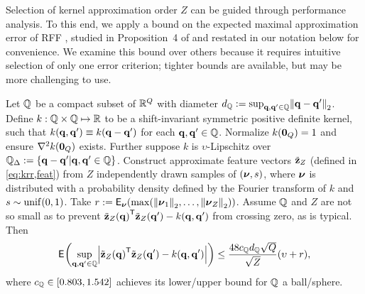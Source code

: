 Selection of kernel approximation order $Z$ 
can be guided through performance analysis.  
To this end, 
we apply a bound 
on the expected maximal approximation error 
of RFF \cite{rahimi:07:rff},
studied in Proposition~4 of \cite{sutherland:15:ote}
and restated in our notation below for convenience.
We examine this bound over others
because it requires intuitive selection 
of only one error criterion;
tighter bounds are available,
but may be more challenging to use.
\begin{thm}
	Let $\mathbb{Q}$ 
	be a compact subset of $\mathbb{R}^{Q}$
	with diameter $d_\setQ := \sup_{\bmq,\bmq' \in \setQ} \norm{\bmq-\bmq'}_2$.
	Define $k : \mathbb{Q} \times \mathbb{Q} \mapsto \mathbb{R}$  
	to be a shift-invariant symmetric positive definite kernel,
	such that $k(\mathbf{q},\mathbf{q}') \equiv k(\mathbf{q}-\mathbf{q}')$
	for each $\mathbf{q},\mathbf{q}' \in \mathbb{Q}$.
	Normalize $k(\boldsymbol{0}_{Q}) = 1$ 
	and ensure $\nabla^2 k(\boldsymbol{0}_{Q})$ exists.
	Further suppose $k$ is $\upsilon$-Lipschitz 
	over $\setQD := \set{\bmq-\bmq'|\bmq,\bmq'\in\setQ}$.
	Construct approximate feature vectors $\tilde{\mathbf{z}}_Z$
	(defined in \eqref{eq:krr,feat})
	from $Z$ independently drawn samples of $\paren{\bmnu,s}$,
	where $\boldsymbol{\nu}$ is distributed 
	with a probability density defined by the Fourier transform of $k$
	and $s \sim \unif{0,1}$.
	Take $r := \expect{\bmnu}{\max\paren{\norm{\bmnu_1}_2,\dots,\norm{\bmnu_Z}_2}}$.
	Assume $\mathbb{Q}$ and $Z$ are not so small
	as to prevent $\bmztZa{\bmq}\tpose\bmztZa{\bmq'}-k\paren{\bmq,\bmq'}$
	from crossing zero, as is typical. Then
	\label{thm:rff-approx}
	\begin{align}
		\expect{}{\sup_{\bmq,\bmq' \in \setQ} 
			\abs{\bmztZa{\bmq}\tpose\bmztZa{\bmq'}-k\paren{\bmq,\bmq'}}}
			\leq 
			\frac{48 c_\setQ d_\setQ \sqrt{Q}}{\sqrt{Z}} \paren{\upsilon + r},
			\label{eq:krr,rff-approx}
	\end{align}
	where $c_\setQ \in \brac{0.803,1.542}$
	achieves its lower/upper bound for $\mathbb{Q}$ a ball/sphere.
\end{thm}

